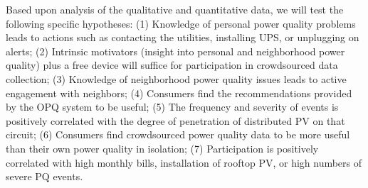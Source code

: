 Based upon analysis of the qualitative and quantitative data, we will test the following specific hypotheses: (1) Knowledge of personal power quality problems leads to actions such as contacting the utilities, installing UPS, or unplugging on alerts; (2) Intrinsic motivators (insight into personal and neighborhood power quality) plus a free device will suffice for participation in crowdsourced data collection; (3) Knowledge of neighborhood power quality issues leads to active engagement with neighbors; (4) Consumers find the recommendations provided by the OPQ system to be useful; (5) The frequency and severity of events is positively correlated with the degree of penetration of distributed PV on that circuit; (6) Consumers find crowdsourced power quality data to be more useful than their own power quality in isolation; (7) Participation is positively correlated with high monthly bills, installation of rooftop PV, or high numbers of severe PQ events.

















